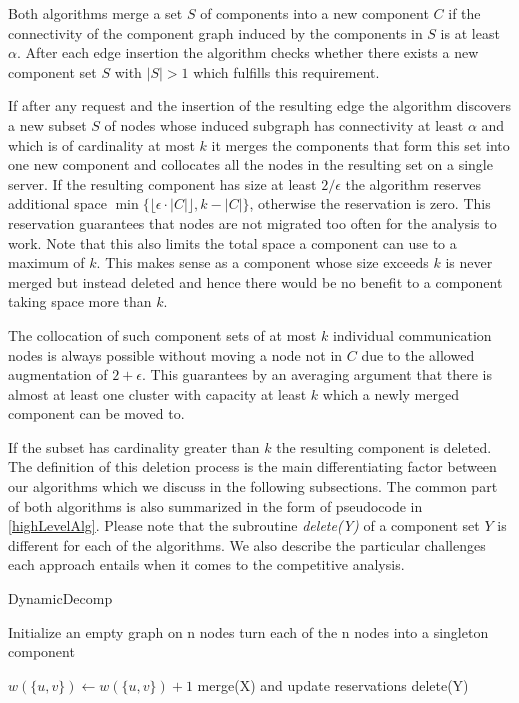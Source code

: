 \documentclass[a4paper,xcolor=dvipsnames, tikz, 12pt]{article}
\theoremstyle{definition}
\begin{document}
	Both algorithms merge a set $S$ of components into a new component $C$ if the connectivity of the component graph induced by the components in $S$ is at least $\alpha$. After each edge insertion the algorithm checks whether there exists a new component set $S$ with $|S|>1$ which fulfills this requirement.
	
	If after any request and the insertion of the resulting edge the algorithm discovers a new subset $S$ of nodes whose induced subgraph has connectivity at least $\alpha$ and which is of cardinality at most $k$ it merges the components that form this set into one new component and collocates all the nodes in the resulting set on a single server. If the resulting component has size at least $2/\epsilon$ the algorithm reserves additional space $\min\{\lfloor\epsilon\cdot|C|\rfloor,k-|C|\}$, otherwise the reservation is zero. This reservation guarantees that nodes are not migrated too often for the analysis to work. Note that this also limits the total space a component can use to a maximum of $k$. This makes sense as a component whose size exceeds $k$ is never merged but instead deleted and hence there would be no benefit to a component taking space more than $k$.
	
	The collocation of such component sets of at most $k$ individual communication nodes is always possible without moving a node not in $C$ due to the allowed augmentation of $2+\epsilon$. This guarantees by an averaging argument that there is almost at least one cluster with capacity at least $k$ which a newly merged component can be moved to.
	
	If the subset has cardinality greater than $k$ the resulting component is deleted. The definition of this deletion process is the main differentiating factor between our algorithms which we discuss in the following subsections. The common part of both algorithms is also summarized in the form of pseudocode in \cref{highLevelAlg}. Please note that the subroutine \textit{delete(Y)} of a component set $Y$ is different for each of the algorithms. We also describe the particular challenges each approach entails when it comes to the competitive analysis.
	
	\begin{algorithm}[t]
		\caption{DynamicDecomp}
		\label{highLevelAlg}
		\begin{algorithmic}
			\STATE Initialize an empty graph on n nodes
			\STATE turn each of the n nodes into a singleton component
			
			\STATE $w(\{u,v\})\gets w(\{u,v\})+1$
			\ENDIF
			\STATE merge(X) and update reservations %
			\ENDIF
			\STATE delete(Y)
			\ENDIF	
			
			\ENDFOR
			
		\end{algorithmic}
	\end{algorithm}
	
\end{document}
